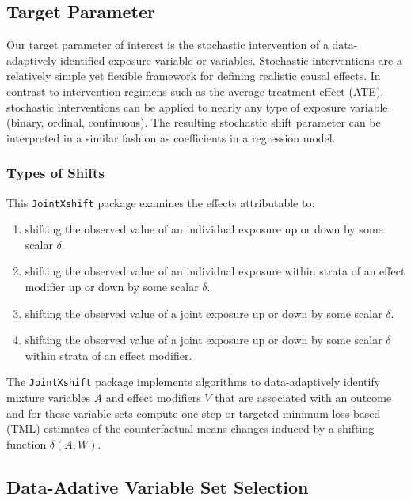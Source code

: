 \documentclass[
]{article}
\providecommand{\tightlist}{%
  \setlength{\itemsep}{0pt}\setlength{\parskip}{0pt}}
\begin{document}
\hypertarget{target-parameter}{%
\subsection{Target Parameter}\label{target-parameter}}

Our target parameter of interest is the stochastic intervention of a
data-adaptively identified exposure variable or variables. Stochastic
interventions are a relatively simple yet flexible framework for
defining realistic causal effects. In contrast to intervention regimens
such as the average treatment effect (ATE), stochastic interventions can
be applied to nearly any type of exposure variable (binary, ordinal,
continuous). The resulting stochastic shift parameter can be interpreted
in a similar fashion as coefficients in a regression model.

\hypertarget{types-of-shifts}{%
\subsubsection{Types of Shifts}\label{types-of-shifts}}

This \texttt{JointXshift} package examines the effects attributable to:

\begin{enumerate}
\def\labelenumi{\arabic{enumi}.}
\tightlist
\item
  shifting the observed value of an individual exposure up or down by
  some scalar \(\delta\).
\item
  shifting the observed value of an individual exposure within strata of
  an effect modifier up or down by some scalar \(\delta\).
\item
  shifting the observed value of a joint exposure up or down by some
  scalar \(\delta\).
\item
  shifting the observed value of a joint exposure up or down by some
  scalar \(\delta\) within strata of an effect modifier.
\end{enumerate}

The \texttt{JointXshift} package implements algorithms to data-adaptively
identify mixture variables \(A\) and effect modifiers \(V\) that are
associated with an outcome and for these variable sets compute one-step
or targeted minimum loss-based (TML) estimates of the counterfactual
means changes induced by a shifting function \(\delta(A,W)\).

\hypertarget{data-adative-variable-set-selection}{%
\subsection{Data-Adative Variable Set
Selection}\label{data-adative-variable-set-selection}}
\end{document}
